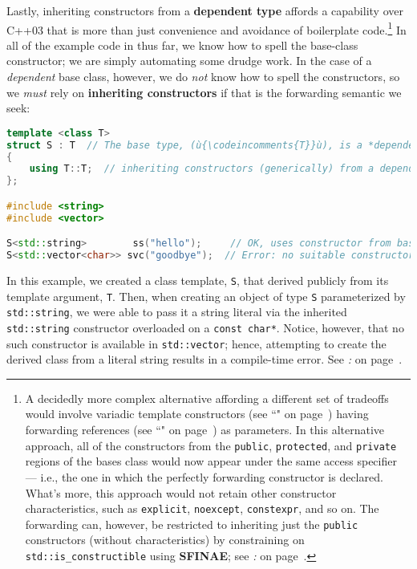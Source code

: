 \noindent Lastly, inheriting constructors from a \textbf{dependent
type} affords a capability over C++03 that is more than just convenience
and avoidance of boilerplate code.{\cprotect\footnote{A decidedly more
complex alternative affording a different set of tradeoffs would
  involve variadic template constructors (see ``" on page~\pageref{variadictemplate}) having
 forwarding references (see ``" on page~\pageref{forwardingref}) as parameters. In this
  alternative approach, all of the constructors from the
  \mbox{\texttt{public}}, \mbox{\texttt{protected}}, and \mbox{\texttt{private}} regions of the
  bases class would now appear under the same access specifier --- i.e.,
  the one in which the perfectly forwarding constructor is declared.
  What's more, this approach would not retain other constructor
  characteristics, such as \texttt{explicit}, \texttt{noexcept},
  \texttt{constexpr}, and so on. The forwarding can, however, be restricted to
  inheriting just the \texttt{public} constructors (without
  characteristics) by constraining on \texttt{std::is\_constructible}
  using \textbf{SFINAE}; see \textit{: } on page~\pageref{access-levels-of-inherited-constructors-are-same-as-in-base-class}.}} In all of the example code in \textit{} thus far, we know how to spell the
base-class constructor; we are simply automating some drudge work. In
the case of a \emph{dependent} base class, however, we do \emph{not}
know how to spell the constructors, so we \emph{must} rely on
\textbf{inheriting constructors} if that is the forwarding semantic we
seek:

\begin{lstlisting}[language=C++]
template <class T>
struct S : T  // The base type, (ù{\codeincomments{T}}ù), is a *dependent type*.
{
    using T::T;  // inheriting constructors (generically) from a dependent type
};

#include <string>
#include <vector>

S<std::string>        ss("hello");     // OK, uses constructor from base
S<std::vector<char>> svc("goodbye");  // Error: no suitable constructor in base
\end{lstlisting}
    
\noindent In this example, we created a class template, \texttt{S}, that
derived publicly from its template argument, \texttt{T}. Then, when
creating an object of type \texttt{S} parameterized by
\texttt{std::string}, we were able to pass it a string literal via
the inherited \texttt{std::string} constructor overloaded on a
\texttt{const}~\texttt{char*}. Notice, however, that no such constructor
is available in \texttt{std::vector}; hence, attempting to create the
derived class from a literal string results in a compile-time error. See \textit{: } on page~\pageref{incorporating-reusable-functionality-via-a-mix-in-class}.

